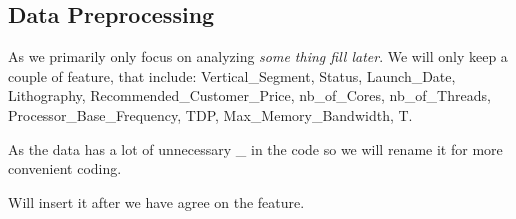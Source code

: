 \subsection{Data Preprocessing}
As we primarily only focus on analyzing \emph{some thing fill later}. We will only keep a couple of feature, that include: Vertical\_Segment, Status, Launch\_Date, Lithography, Recommended\_Customer\_Price, nb\_of\_Cores, nb\_of\_Threads, Processor\_Base\_Frequency, TDP, Max\_Memory\_Bandwidth, T.

As the data has a lot of unnecessary \_ in the code so we will rename it for more convenient coding.

Will insert it after we have agree on the feature.


